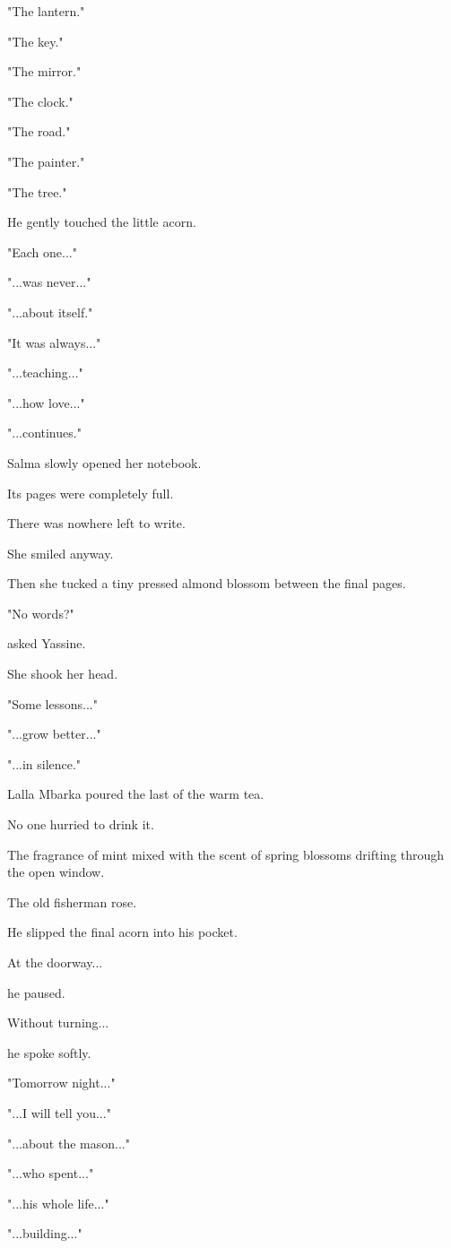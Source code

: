 \documentclass[12pt,openany]{book}
\begin{document}
"The lantern."

"The key."

"The mirror."

"The clock."

"The road."

"The painter."

"The tree."

He gently touched the little acorn.

"Each one..."

"...was never..."

"...about itself."

"It was always..."

"...teaching..."

"...how love..."

"...continues."

Salma slowly opened her notebook.

Its pages were completely full.

There was nowhere left to write.

She smiled anyway.

Then she tucked a tiny pressed almond blossom between the final pages.

"No words?"

asked Yassine.

She shook her head.

"Some lessons..."

"...grow better..."

"...in silence."

Lalla Mbarka poured the last of the warm tea.

No one hurried to drink it.

The fragrance of mint mixed with the scent of spring blossoms drifting through the open window.

The old fisherman rose.

He slipped the final acorn into his pocket.

At the doorway...

he paused.

Without turning...

he spoke softly.

"Tomorrow night..."

"...I will tell you..."

"...about the mason..."

"...who spent..."

"...his whole life..."

"...building..."
\end{document}

